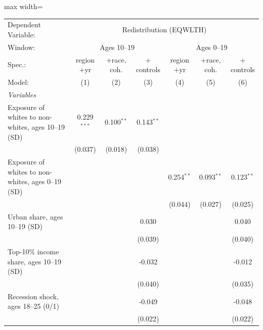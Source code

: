       \begin{adjustbox}{max width=\linewidth}
   \begin{tabular}{lcccccc}
      \tabularnewline \midrule \midrule
      Dependent Variable: & \multicolumn{6}{c}{Redistribution (EQWLTH)}\\
      Window: & \multicolumn{3}{c}{Ages 10--19} & \multicolumn{3}{c}{Ages 0--19} \\ 
      Spec.:                                             & region$+$yr   & $+$race, coh. & $+$controls  & region$+$yr  & $+$race, coh. & $+$controls \\   
      Model:                                             & (1)           & (2)           & (3)          & (4)          & (5)           & (6)\\  
      \midrule
      \emph{Variables}\\
      Exposure of whites to non-whites, ages 10--19 (SD) & 0.229$^{***}$ & 0.100$^{**}$  & 0.143$^{**}$ &              &               &   \\   
                                                         & (0.037)       & (0.018)       & (0.038)      &              &               &   \\   
      Exposure of whites to non-whites, ages 0--19 (SD)  &               &               &              & 0.254$^{**}$ & 0.093$^{**}$  & 0.123$^{**}$\\   
                                                         &               &               &              & (0.044)      & (0.027)       & (0.025)\\   
      Urban share, ages 10--19 (SD)                      &               &               & 0.030        &              &               & 0.040\\   
                                                         &               &               & (0.039)      &              &               & (0.040)\\   
      Top-10\% income share, ages 10--19 (SD)            &               &               & -0.032       &              &               & -0.012\\   
                                                         &               &               & (0.040)      &              &               & (0.035)\\   
      Recession shock, ages 18--25 (0/1)                 &               &               & -0.049       &              &               & -0.048\\   
                                                         &               &               & (0.022)      &              &               & (0.022)\\   

\end{tabular}
\end{adjustbox}
